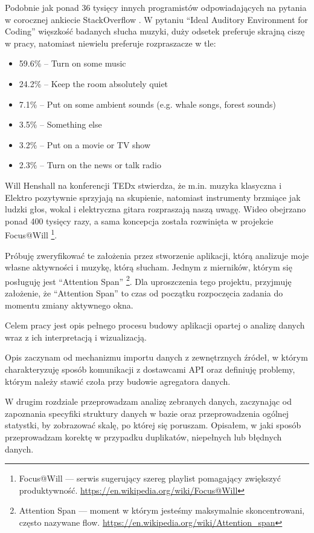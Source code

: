 \documentclass[brudnopis]{xmgr}
\begin{document}
    Podobnie jak ponad 36 tysięcy innych programistów odpowiadających na pytania w corocznej ankiecie StackOverflow \cite{stackoverflow:survey2017}.
    W pytaniu ``Ideal Auditory Environment for Coding''
    więszkość badanych słucha muzyki, duży odsetek preferuje skrajną ciszę w pracy, natomiast niewielu preferuje rozpraszacze w tle:
    \begin{itemize}
        \item 59.6\% -- Turn on some music
        \item 24.2\% -- Keep the room absolutely quiet
        \item 7.1\% -- Put on some ambient sounds (e.g. whale songs, forest sounds)
        \item 3.5\% -- Something else
        \item 3.2\% -- Put on a movie or TV show
        \item 2.3\% -- Turn on the news or talk radio
    \end{itemize}

    Will Henshall na konferencji TEDx \cite{tedx:music-at-work} stwierdza, że m.in. muzyka klasyczna i Elektro pozytywnie sprzyjają na skupienie,
    natomiast instrumenty brzmiące jak ludzki głos, wokal i elektryczna gitara rozpraszają naszą uwagę.
    Wideo obejrzano ponad 400 tysięcy razy, a sama koncepcja została rozwinięta w projekcie Focus@Will
    \footnote{Focus@Will --- serwis sugerujący szereg playlist pomagający zwiększyć produktywność. \url{https://en.wikipedia.org/wiki/Focus@Will}}.

    Próbuję zweryfikować te założenia przez stworzenie aplikacji, którą analizuje moje własne aktywności i muzykę, którą słucham.
    Jednym z mierników, którym się posługuję jest ``Attention Span''
    \footnote{Attention Span --- moment w którym jesteśmy maksymalnie skoncentrowani, często nazywane flow. \url{https://en.wikipedia.org/wiki/Attention_span}}.
    Dla uproszczenia tego projektu, przyjmuję założenie, że ``Attention Span'' to czas od początku rozpoczęcia zadania do momentu zmiany aktywnego okna.

    Celem pracy jest opis pełnego procesu budowy aplikacji opartej o analizę danych wraz z ich interpretacją i wizualizacją.

    Opis zaczynam od mechanizmu importu danych z zewnętrznych źródeł, w którym charakteryzuję sposób komunikacji z dostawcami API
    oraz definiuję problemy, którym należy stawić czoła przy budowie agregatora danych.

    W drugim rozdziale przeprowadzam analizę zebranych danych, zaczynając od zapoznania specyfiki struktury danych w bazie
    oraz przeprowadzenia ogólnej statystki, by zobrazować skalę, po której się poruszam.
    Opisałem, w jaki sposób przeprowadzam korektę w przypadku duplikatów, niepełnych lub błędnych danych.
\end{document}
